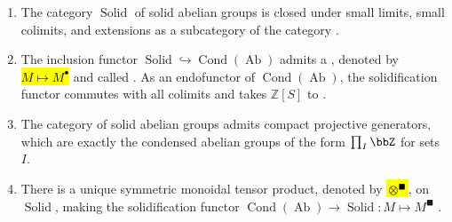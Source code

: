 \begin{theorem}  \label{theorem:solidification_of_condensed_abelian_group}
    \begin{enumerate}
        \item The category $\operatorname{Solid}$ of solid abelian groups is closed under small limits, small colimits, and extensions as a subcategory of the category .

        \item The inclusion functor $\operatorname{Solid} \hookrightarrow \operatorname{Cond}(\operatorname{Ab})$ admits a , denoted by \hl{$M \mapsto M^\bullet$} and called . As an endofunctor of $\operatorname{Cond}(\operatorname{Ab})$, the solidification functor commutes with all colimits and takes $\mathbb{Z}[S]$ to . 

        \item The category of solid abelian groups admits compact projective generators, which are exactly the condensed abelian groups of the form $\prod_I \bbZ$ for sets $I$.

        \item There is a unique symmetric monoidal tensor product, denoted by \hl{$\otimes^\blacksquare$}, on $\operatorname{Solid}$, making the solidification functor $\operatorname{Cond}(\operatorname{Ab}) \to \operatorname{Solid}: M \mapsto M^\blacksquare$ . 
    \end{enumerate}
\end{theorem}